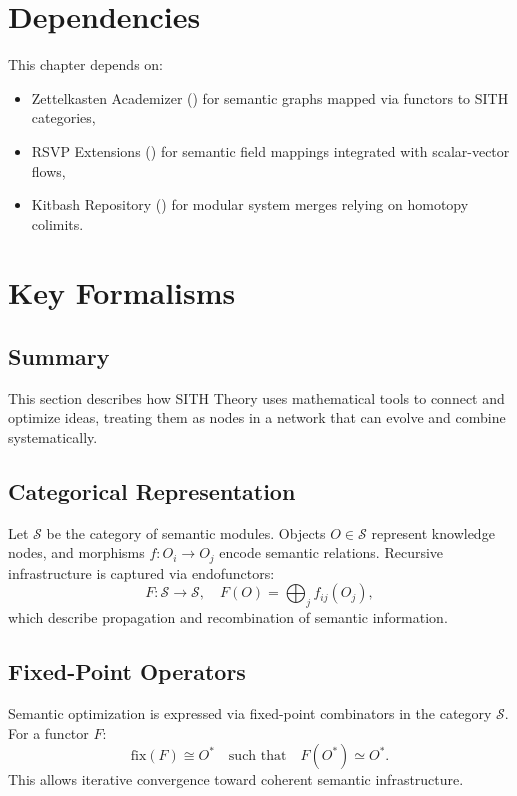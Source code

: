 \documentclass[11pt,oneside]{memoir}
\theoremstyle{plain}
\newcommand{\Sfun}{\mathcal{S}}
\begin{document}
\section{Dependencies}
This chapter depends on:
\begin{itemize}
    \item Zettelkasten Academizer () for semantic graphs mapped via functors to SITH categories,
    \item RSVP Extensions () for semantic field mappings integrated with scalar-vector flows,
    \item Kitbash Repository () for modular system merges relying on homotopy colimits.
\end{itemize}

\section{Key Formalisms}
\subsection{Summary}
This section describes how SITH Theory uses mathematical tools to connect and optimize ideas, treating them as nodes in a network that can evolve and combine systematically.

\subsection{Categorical Representation}
Let \(\Sfun\) be the category of semantic modules. Objects \(O \in \Sfun\) represent knowledge nodes, and morphisms \(f: O_i \to O_j\) encode semantic relations. Recursive infrastructure is captured via endofunctors:
\begin{equation}
    F: \Sfun \to \Sfun, \quad F(O) = \bigoplus_{j} f_{ij}(O_j),
\end{equation}
which describe propagation and recombination of semantic information.

\subsection{Fixed-Point Operators}
Semantic optimization is expressed via fixed-point combinators in the category \(\Sfun\). For a functor \(F\):
\begin{equation}
    \text{fix}(F) \cong O^* \quad \text{such that} \quad F(O^*) \simeq O^*.
\end{equation}
This allows iterative convergence toward coherent semantic infrastructure.
\end{document}
